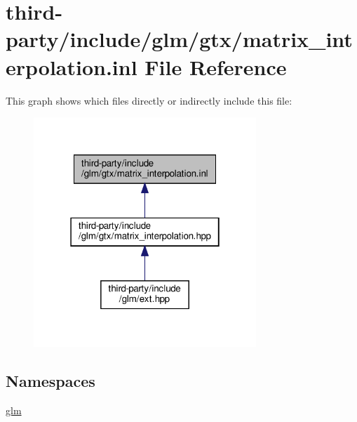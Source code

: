 \hypertarget{matrix__interpolation_8inl}{}\section{third-\/party/include/glm/gtx/matrix\+\_\+interpolation.inl File Reference}
\label{matrix__interpolation_8inl}
This graph shows which files directly or indirectly include this file\+:
\nopagebreak
\begin{figure}[H]
\begin{center}
\leavevmode
\includegraphics[width=238pt]{matrix__interpolation_8inl__dep__incl}
\end{center}
\end{figure}
\subsection*{Namespaces}
\begin{DoxyCompactItemize}
\item 
 \hyperlink{namespaceglm}{glm}
\end{DoxyCompactItemize}
